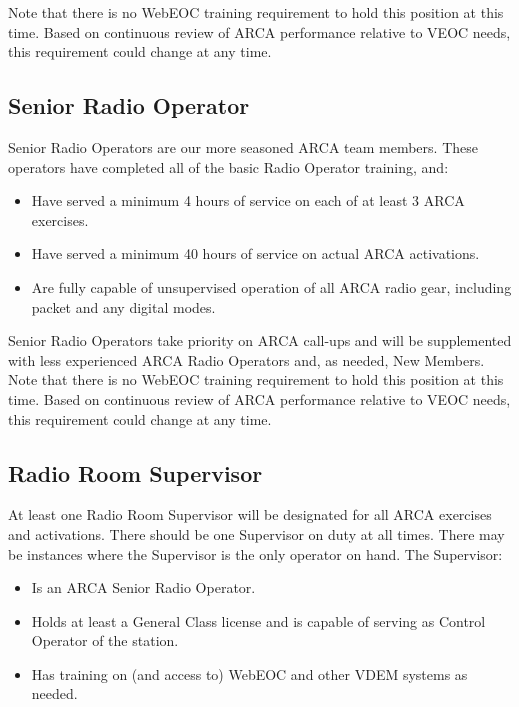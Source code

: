 \documentclass[pdflatex,letterpaper,twoside,12pt]{book}
\begin{document}
Note that there is no WebEOC training requirement to hold this position at this time.  Based on continuous review of ARCA performance relative to VEOC needs, this requirement could change at any time.

\subsection{Senior Radio Operator}

Senior Radio Operators are our more seasoned ARCA team members.  These operators have completed all of the basic Radio Operator training, and:

\begin{itemize}
	\item Have served a minimum 4 hours of service on each of at least 3 ARCA exercises.
	\item Have served a minimum 40 hours of service on actual ARCA activations.
	\item Are fully capable of unsupervised operation of all ARCA radio gear, including packet and any digital modes.
\end{itemize}

Senior Radio Operators take priority on ARCA call-ups and will be supplemented with less experienced ARCA Radio Operators and, as needed, New Members.
Note that there is no WebEOC training requirement to hold this position at this time.  Based on continuous review of ARCA performance relative to VEOC needs, this requirement could change at any time.

\subsection{Radio Room Supervisor}

At least one Radio Room Supervisor will be designated for all ARCA exercises and activations.  There should be one Supervisor on duty at all times.  There may be instances where the Supervisor is the only operator on hand.  The Supervisor:

\begin{itemize}
	\item Is an ARCA Senior Radio Operator.
	\item Holds at least a General Class license and is capable of serving as Control Operator of the station.
	\item Has training on (and access to) WebEOC and other VDEM systems as needed.
\end{itemize}
\end{document}

